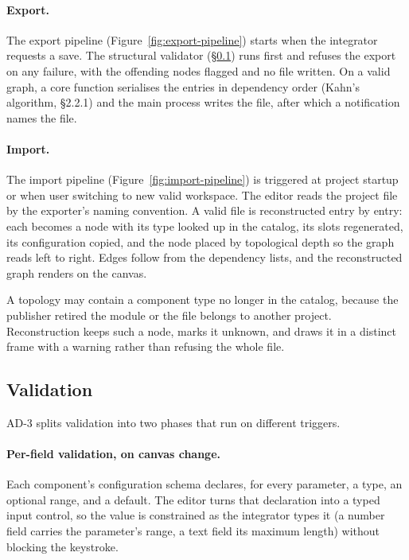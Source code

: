 \paragraph{Export.}
The export pipeline (Figure~\ref{fig:export-pipeline}) starts when the integrator requests a save. The structural validator (\S\ref{sec:validation-engine}) runs first and refuses the export on any failure, with the offending nodes flagged and no file written. On a valid graph, a core function serialises the entries in dependency order (Kahn's algorithm, \S2.2.1) and the main process writes the file, after which a notification names the file.

\paragraph{Import.}
The import pipeline (Figure~\ref{fig:import-pipeline}) is triggered at project startup or when user switching to new valid workspace. The editor reads the project file by the exporter's naming convention. A valid file is reconstructed entry by entry: each becomes a node with its type looked up in the catalog, its slots regenerated, its configuration copied, and the node placed by topological depth so the graph reads left to right. Edges follow from the dependency lists, and the reconstructed graph renders on the canvas.

A topology may contain a component type no longer in the catalog, because the publisher retired the module or the file belongs to another project. Reconstruction keeps such a node, marks it unknown, and draws it in a distinct frame with a warning rather than refusing the whole file.

\FloatBarrier

\pagebreak

\subsection{Validation}
\label{sec:validation-engine}
AD-3 splits validation into two phases that run on different triggers.

\paragraph{Per-field validation, on canvas change.}
Each component's configuration schema declares, for every parameter, a type, an optional range, and a default. The editor turns that declaration into a typed input control, so the value is constrained as the integrator types it (a number field carries the parameter's range, a text field its maximum length) without blocking the keystroke.

